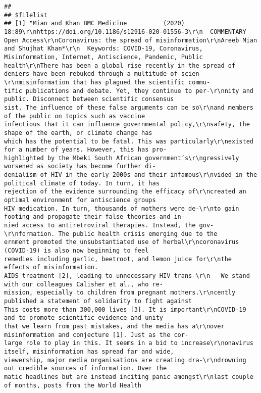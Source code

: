 \documentclass[
]{book}
\begin{document}
\begin{verbatim}
## 
## $filelist
## [1] "Mian and Khan BMC Medicine          (2020) 18:89\r\nhttps://doi.org/10.1186/s12916-020-01556-3\r\n  COMMENTARY                                                                                                                                          Open Access\r\nCoronavirus: the spread of misinformation\r\nAreeb Mian and Shujhat Khan*\r\n  Keywords: COVID-19, Coronavirus, Misinformation, Internet, Antiscience, Pandemic, Public health\r\nThere has been a global rise recently in the spread of                                 deniers have been rebuked through a multitude of scien-\r\nmisinformation that has plagued the scientific commu-                                  tific publications and debate. Yet, they continue to per-\r\nnity and public. Disconnect between scientific consensus                               sist. The influence of these false arguments can be so\r\nand members of the public on topics such as vaccine                                    infectious that it can influence governmental policy,\r\nsafety, the shape of the earth, or climate change has                                  which has the potential to be fatal. This was particularly\r\nexisted for a number of years. However, this has pro-                                  highlighted by the Mbeki South African government’s\r\ngressively worsened as society has become further di-                                  denialism of HIV in the early 2000s and their infamous\r\nvided in the political climate of today. In turn, it has                               rejection of the evidence surrounding the efficacy of\r\ncreated an optimal environment for antiscience groups                                  HIV medication. In turn, thousands of mothers were de-\r\nto gain footing and propagate their false theories and in-                             nied access to antiretroviral therapies. Instead, the gov-\r\nformation. The public health crisis emerging due to the                                ernment promoted the unsubstantiated use of herbal\r\ncoronavirus (COVID-19) is also now beginning to feel                                   remedies including garlic, beetroot, and lemon juice for\r\nthe effects of misinformation.                                                         AIDS treatment [2], leading to unnecessary HIV trans-\r\n   We stand with our colleagues Calisher et al., who re-                               mission, especially to children from pregnant mothers.\r\ncently published a statement of solidarity to fight against                            This costs more than 300,000 lives [3]. It is important\r\nCOVID-19 and to promote scientific evidence and unity                                  that we learn from past mistakes, and the media has a\r\nover misinformation and conjecture [1]. Just as the cor-                               large role to play in this. It seems in a bid to increase\r\nonavirus itself, misinformation has spread far and wide,                               viewership, major media organisations are creating dra-\r\ndrowning out credible sources of information. Over the                                 matic headlines but are instead inciting panic amongst\r\nlast couple of months, posts from the World Health                                     
\end{verbatim}
\end{document}
